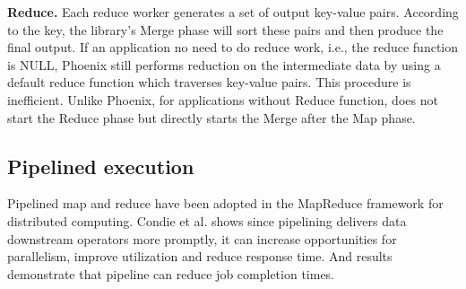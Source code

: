 {\bf Reduce.}
Each reduce worker generates a set of output key-value pairs.
According to the key, the library's Merge phase  will sort these pairs and then produce the final output. 
If an application no need to do reduce work, i.e., the reduce function is NULL,
Phoenix still performs reduction on the intermediate data by using a default reduce function which traverses key-value pairs. 
This procedure is inefficient. 
Unlike Phoenix, for applications without Reduce function, \myds does not start the Reduce phase but directly starts the Merge after the Map phase.


\subsection{Pipelined execution}
Pipelined map and reduce have been adopted 
in the MapReduce framework for distributed computing\cite{Condie2010mapreduce}. 
Condie et al. shows since pipelining delivers data downstream operators
more promptly, it can increase opportunities for
parallelism, improve utilization and reduce response
time.
And results demonstrate that pipeline can reduce job completion times.
 



